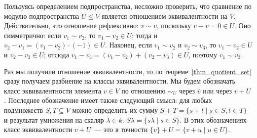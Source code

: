Пользуясь определением подпространства,
несложно проверить, что сравнение по модулю подпространства $U\leq V$
является отношением эквивалентности на $V$. Действительно, это отношение
рефлексивно: $v\sim v$, поскольку $v-v=0\in U$. Оно симметрично: если
$v_1\sim v_2$, то $v_1-v_2\in U$; тогда и $v_2-v_1=(v_1-v_2)\cdot
(-1)\in U$. Наконец, если $v_1\sim v_2$ и $v_2\sim v_3$, то
$v_1-v_2\in U$ и $v_2-v_3\in U$; отсюда
$v_1-v_3=(v_1-v_2)+(v_2-v_3)\in U$, поэтому $v_1\sim v_3$.

Раз мы получили отношение эквивалентности, то по
теореме~\ref{thm_quotient_set} сразу получаем разбиение на классы
эквивалентности. Мы будем обозначать класс эквивалентности элемента
$v\in V$ по отношению $\sim_U$ через $\overline{v}$ или через
$v+U$. Последнее обозначение имеет также следующий смысл: для любых
подмножеств $S,T\subseteq V$ можно определить их сумму $S+T=\{s+t\mid
s\in S, t\in T\}$ и результат умножения на скаляр $\lambda\in k$:
$S\lambda=\{s\lambda\mid s\in S\}$. В этих обозначениях класс
эквивалентности $v+U$~--- это в точности $\{v\}+U=\{v+u\mid u\in U\}$.

